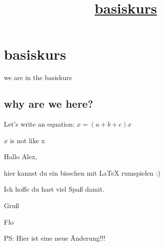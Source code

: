 \documentclass[11pt]{scrartcl}
\begin{document}
\title{\underline{basiskurs}}
\maketitle
\section{basiskurs}
we are in the basiskurs
\subsection{why are we here?}
Let's write an equation: $x = (a + b + c) x$

$x$ is not like x


Hallo Alex,

hier kannst du ein bisschen mit LaTeX rumspielen :)


Ich hoffe du hast viel Spaß damit.

Gruß

Flo 
 
PS: Hier ist eine neue Änderung!!!
\end{document}
